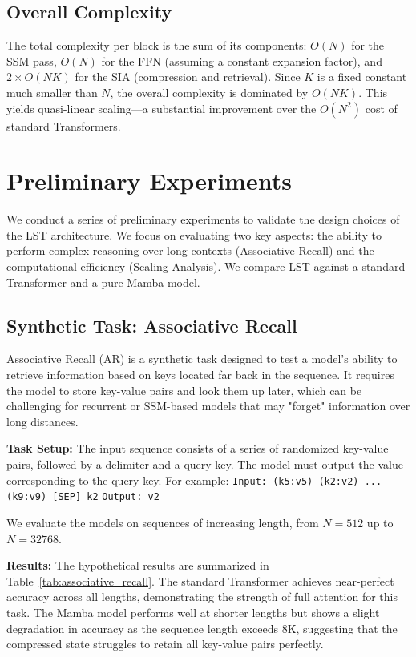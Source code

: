 \documentclass[10pt,twocolumn,letterpaper]{article}
\begin{document}
\subsection{Overall Complexity}

The total complexity per block is the sum of its components: \(O(N)\) for the SSM pass, \(O(N)\) for the FFN (assuming a constant expansion factor), and \(2\times O(NK)\) for the SIA (compression and retrieval). Since \(K\) is a fixed constant much smaller than \(N\), the overall complexity is dominated by \(O(NK)\). This yields quasi-linear scaling—a substantial improvement over the \(O(N^{2})\) cost of standard Transformers.

\section{Preliminary Experiments}

We conduct a series of preliminary experiments to validate the design choices of the LST architecture. We focus on evaluating two key aspects: the ability to perform complex reasoning over long contexts (Associative Recall) and the computational efficiency (Scaling Analysis). We compare LST against a standard Transformer and a pure Mamba model.

\subsection{Synthetic Task: Associative Recall}

Associative Recall (AR) is a synthetic task designed to test a model's ability to retrieve information based on keys located far back in the sequence. It requires the model to store key-value pairs and look them up later, which can be challenging for recurrent or SSM-based models that may "forget" information over long distances.

\textbf{Task Setup:} The input sequence consists of a series of randomized key-value pairs, followed by a delimiter and a query key. The model must output the value corresponding to the query key. For example:
\texttt{Input: (k5:v5) (k2:v2) ... (k9:v9) [SEP] k2}
\texttt{Output: v2}

We evaluate the models on sequences of increasing length, from \(N=512\) up to \(N=32768\).

\textbf{Results:} The hypothetical results are summarized in Table~\ref{tab:associative_recall}. The standard Transformer achieves near-perfect accuracy across all lengths, demonstrating the strength of full attention for this task. The Mamba model performs well at shorter lengths but shows a slight degradation in accuracy as the sequence length exceeds 8K, suggesting that the compressed state struggles to retain all key-value pairs perfectly.
\end{document}
